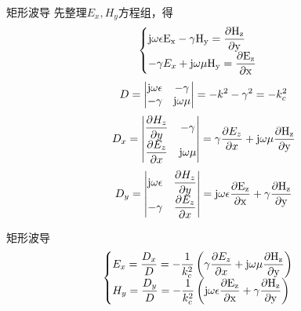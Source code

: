 \begin{frame}{矩形波导}
    先整理$E_x,H_y$方程组，得
    \begin{align*}
        \begin{cases}
            \rm{j}\omega\epsilon E_x-\gamma H_y=\dfrac{\partial H_z}{\partial y} \\
            -\gamma E_x+\rm{j}\omega\mu H_y=\dfrac{\partial E_z}{\partial x}     \\
        \end{cases}
    \end{align*}
    \begin{align*}
        D=
        \begin{vmatrix}
            \rm{j}\omega\epsilon & -\gamma         \\
            -\gamma              & \rm{j}\omega\mu \\
        \end{vmatrix}
        =-k^2-\gamma^2=-k_c^2
    \end{align*}
    \begin{align*}
        D_x=
        \begin{vmatrix}
            \dfrac{\partial H_z}{\partial y} & -\gamma         \\
            \dfrac{\partial E_z}{\partial x} & \rm{j}\omega\mu \\
        \end{vmatrix}
        =\gamma\frac{\partial E_z}{\partial x}+\rm{j}\omega\mu\frac{\partial H_z}{\partial y}
    \end{align*}
    \begin{align*}
        D_y=
        \begin{vmatrix}
            \rm{j}\omega\epsilon & \dfrac{\partial H_z}{\partial y} \\
            -\gamma              & \dfrac{\partial E_z}{\partial x} \\
        \end{vmatrix}
        =\rm{j}\omega\epsilon\frac{\partial E_z}{\partial x}+\gamma \frac{\partial H_z}{\partial y}
    \end{align*}
\end{frame}

\begin{frame}{矩形波导}
    \begin{align}
        \begin{cases}
            E_x=\dfrac{D_x}{D}=-\dfrac{1}{k_c^2}\left(\gamma\dfrac{\partial E_z}{\partial x}+\rm{j}\omega\mu\dfrac{\partial H_z}{\partial y}\right) \\
            H_y=\dfrac{D_y}{D}=-\dfrac{1}{k_c^2}\left(\rm{j}\omega\epsilon\dfrac{\partial E_z}{\partial x}+\gamma\dfrac{\partial H_z}{\partial y}\right)
        \end{cases}
        \label{eqn6-13}
    \end{align}
\end{frame}


